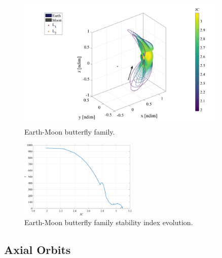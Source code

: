 \begin{figure}[ht]
    \centering
    \includegraphics[width=0.9\textwidth]{figures/L2ButterflyFamily.pdf}
    \caption{Earth-Moon butterfly family.}
    \label{fig:butterfly}
\end{figure}

\begin{figure}[ht]
    \centering
    \includegraphics[width=0.5\textwidth]{figures/L2ButterflyStability.pdf}
    \caption{Earth-Moon butterfly family stability index evolution.}
    \label{fig:butterflyStability}
\end{figure}

\subsection{Axial Orbits}
